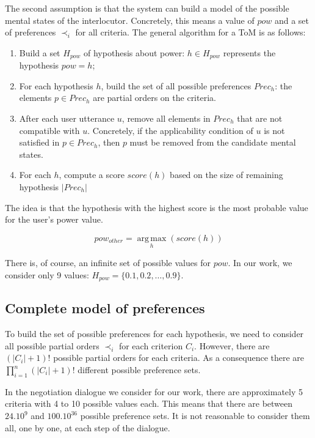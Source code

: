 \documentclass[sigconf]{aamas}  %
\begin{document}
	The second assumption is that the system can build a model of the possible mental states of the interlocutor. Concretely, this means a value of $pow$ and a set of preferences $\prec_i$ for all criteria. The general algorithm for a ToM is as follows:
	\begin{enumerate}
	\item Build a set $H_{pow}$ of hypothesis about power: $h\in H_{pow}$ represents the hypothesis $pow=h$;
	\item For each hypothesis $h$, build the set of all possible preferences $Prec_h$: the elements $p\in Prec_h$ are partial orders on the criteria.
	\item After each user utterance $u$, remove all elements in $Prec_h$ that are not compatible with $u$. Concretely, if the applicability condition of $u$ is not satisfied in $p\in Prec_h$, then $p$ must be removed from the candidate mental states.
	\item For each $h$, compute a score $score(h)$ based on the size of remaining hypothesis $|Prec_h|$
	\end{enumerate}
	The idea is that the hypothesis with the highest score is the most probable value for the user's power value.

	\begin{equation}
	pow_{other} = \operatorname*{arg\,max}_{h} (score(h))
	\end{equation}

	There is, of course, an infinite set of possible values for $pow$. In our work, we consider only 9 values: $H_{pow} = \{0.1, 0.2, \ldots, 0.9\}$.

	\subsection{Complete model of preferences}
	
	To build the set of possible preferences for each hypothesis, we need to consider all possible partial orders $\prec_i$ for each criterion $C_i$. However, there are $(|C_i| + 1)!$ possible partial orders for each criteria. As a consequence there are $\prod_{i=1}^n (|C_i|+1)!$ different possible preference sets.
	
	In the negotiation dialogue we consider for our work, there are approximately 5 criteria with 4 to 10 possible values each. This means that there are between $24.10^9$ and $100.10^{36}$ possible preference sets. It is not reasonable to consider them all, one by one, at each step of the dialogue.
	
\end{document}
